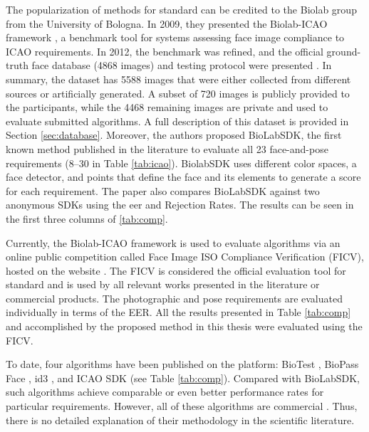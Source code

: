 The popularization of methods for \icao standard can be credited to the Biolab group from the University of Bologna. In 2009, they presented the Biolab-ICAO framework \citep{maltoni2009biolab}, a benchmark tool for systems assessing face image compliance to ICAO requirements. In 2012, the benchmark was refined, and the official ground-truth face database (4868 images) and testing protocol were presented \citep{ferrara2012face}. In summary, the dataset has 5588 images that were either collected from different sources or artificially generated. A subset of 720 images is publicly provided to the participants, while the 4468 remaining images are private and used to evaluate submitted algorithms. A full description of this dataset is provided in Section \ref{sec:database}. Moreover, the authors proposed BioLabSDK, the first known method published in the literature to evaluate all 23 face-and-pose requirements (8--30 in Table \ref{tab:icao}). BiolabSDK uses different color spaces, a face detector, and points that define the face and its elements to generate a score for each requirement. The paper also compares BioLabSDK against two anonymous SDKs using the \acs{eer} and Rejection Rates. The results can be seen in the first three columns of \autoref{tab:comp}.
 

 
Currently, the Biolab-ICAO framework is used to evaluate algorithms via an online public competition called Face Image ISO Compliance Verification (FICV), hosted on the \fvcongoing website \citep{fvcongoing}. The FICV is considered the official evaluation tool for \icao standard and is used by all relevant works presented in the literature or commercial products. The photographic and pose requirements are evaluated individually in terms of the EER. All the results presented in Table \ref{tab:comp} and accomplished by the proposed method in this thesis were evaluated using the FICV.
 
To date, four algorithms have been published on the \fvcongoing platform: BioTest \citep{fvcBioTest}, BioPass Face \citep{fvcVsoft}, id3 \citep{fvcICAOCompliance}, and ICAO SDK \citep{fvcSeamfix} (see Table \ref{tab:comp}). Compared with BioLabSDK, such algorithms achieve comparable or even better performance rates for particular requirements. However, all of these algorithms are commercial \citep{biometrika, id3, seamfix, vsoft}. Thus, there is no detailed explanation of their methodology in the scientific literature.
 
